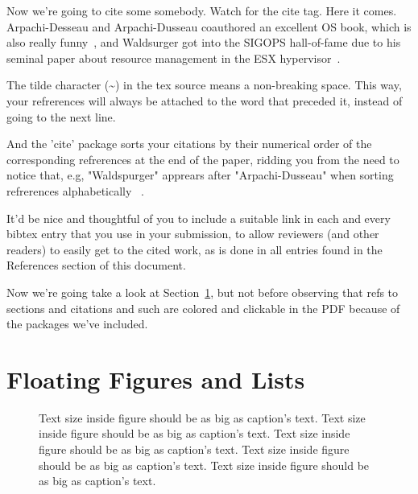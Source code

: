 \documentclass[letterpaper,twocolumn]{article}
\begin{document}
Now we're going to cite some somebody. Watch for the cite tag. Here it comes.
Arpachi-Desseau and Arpachi-Dusseau coauthored an excellent OS book, which is 
also really funny~\cite{arpachiDusseau18:osbook}, and Waldsurger got into the 
SIGOPS hall-of-fame due to his seminal paper about resource management in the
ESX hypervisor~\cite{waldspurger02}.

The tilde character (\~{}) in the tex source means a non-breaking 
space. This way, your refrerences will always be attached to the word that 
preceded it, instead of going to the next line.

And the 'cite' package sorts your citations by their numerical order of the 
corresponding refrerences at the end of the paper, ridding you from the need 
to notice that, e.g, "Waldspurger" apprears after "Arpachi-Dusseau" when 
sorting refrerences alphabetically~
\cite{arpachiDusseau18:osbook, waldspurger02}.

It'd be nice and thoughtful of you to include a suitable link in each and 
every bibtex entry that you use in your submission, to allow reviewers 
(and other readers) to easily get to the cited work, as is done in all 
entries found in the References section of this document.

Now we're going take a look at Section~\ref{sec:figs}, but not before
observing that refs to sections and citations and such are colored and
clickable in the PDF because of the packages we've included.

\section{Floating Figures and Lists}
\label{sec:figs}
\begin{figure}
\begin{center}
\end{center}
\caption{\label{fig:vectors} Text size inside figure should be as big as
  caption's text. Text size inside figure should be as big as
  caption's text. Text size inside figure should be as big as
  caption's text. Text size inside figure should be as big as
  caption's text. Text size inside figure should be as big as
  caption's text. }
\end{figure}
\end{document}
